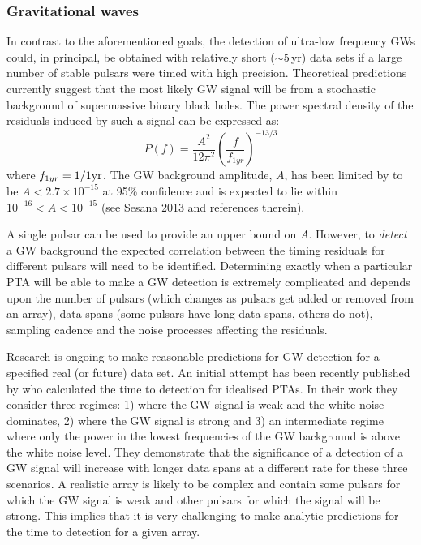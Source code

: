 \documentclass{raa}            %
\begin{document}
\subsubsection{Gravitational waves}

In contrast to the aforementioned goals, the detection of ultra-low frequency GWs could, in principal, be obtained with relatively short ($\sim 5$\,yr) data sets if a large number of stable pulsars were timed with high precision.  Theoretical predictions currently suggest that the most likely GW signal will be from a stochastic background of supermassive binary black holes.  The power spectral density of the residuals induced by such a signal can be expressed as:
\begin{equation}\label{eqn:psd}
P(f) = \frac{A^2}{12\pi^2}\left(\frac{f}{f_{1yr}}\right)^{-13/3}
\end{equation}
where $f_{1yr} = 1/{1 {\rm yr}}$. The GW background amplitude, $A$, has been limited by \cite{src+13} to be $A < 2.7 \times 10^{-15}$ at 95\% confidence and is expected to lie within $10^{-16} < A < 10^{-15}$ (see Sesana 2013 and references therein\nocite{ses13}).  

A single pulsar can be used to provide an upper bound on $A$. However, to \emph{detect} a GW background the expected correlation \citep{hd83} between the timing residuals for different pulsars will need to be identified.  Determining exactly when a particular PTA will be able to make a GW detection is extremely complicated and depends upon the number of pulsars (which changes as pulsars get added or removed from an array), data spans (some pulsars have long data spans, others do not), sampling cadence and the noise processes affecting the residuals. 

Research is ongoing to make reasonable predictions for GW detection for a specified real (or future) data set.    An initial attempt has been recently published by \cite{sejr13} who calculated the time to detection for idealised PTAs.  In their work they consider three regimes: 1) where the GW signal is weak and the white noise dominates, 2) where the GW signal is strong and 3) an intermediate regime where only the power in the lowest frequencies of the GW background is above the white noise level.  They demonstrate that the significance of a detection of a GW signal will increase with longer data spans at a different rate for these three scenarios.  A realistic array is likely to be complex and contain some pulsars for which the GW signal is weak and other pulsars for which the signal will be strong.  This implies that it is very challenging to make analytic predictions for the time to detection for a given array.
\end{document}

